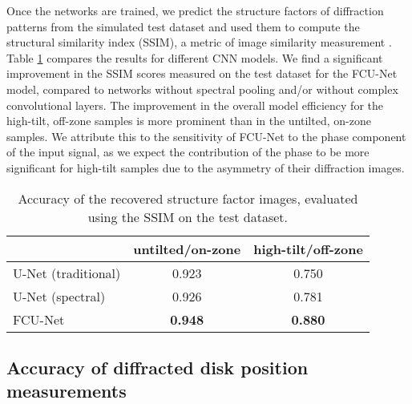 \documentclass[%
 reprint,
superscriptaddress,
 amsmath,
 amssymb,
 prl,
]{revtex4-2}
\begin{document}
 
 
Once the networks are trained, we predict the structure factors of diffraction patterns from the simulated test dataset and used them to compute the structural similarity index (SSIM), a metric of image similarity measurement \citep{wang2004image}. Table \ref{table:FCU_netCompare} compares the results for different CNN models. We find a significant improvement in the SSIM scores measured on the test dataset for the FCU-Net model, compared to networks without spectral pooling and/or without complex convolutional layers. The improvement in the overall model efficiency for the high-tilt, off-zone samples is more prominent than in the untilted, on-zone samples. We attribute this to the sensitivity of FCU-Net to the phase component of the input signal, as we expect the contribution of the phase to be more significant for high-tilt samples due to the asymmetry of their diffraction images.

\begin{table}[h!]
\caption{Accuracy of the recovered structure factor images, evaluated using the SSIM on the test dataset.}
\begin{tabular}{m{2.9cm}cc} 
 \hline
 & untilted/on-zone & high-tilt/off-zone \\ [0.5ex] 
 \hline
 U-Net (traditional) & 0.923 & 0.750  \\ 
 U-Net (spectral) & 0.926 & 0.781  \\
 FCU-Net & \textbf{0.948} & \textbf{0.880} \\
 \hline
\end{tabular}
\label{table:FCU_netCompare}
\end{table}

\subsection*{Accuracy of diffracted disk position measurements}
\end{document}
